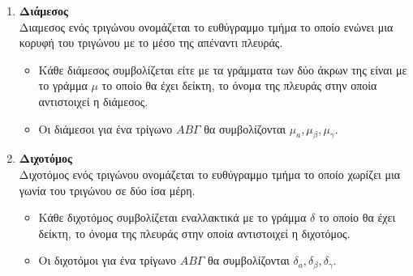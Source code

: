 \documentclass[twoside,10pt]{book}
\begin{document}
\begin{enumerate}[label=\bf\arabic*.]
\item \textbf{Διάμεσος}\\
Διαμεσος ενός τριγώνου ονομάζεται το ευθύγραμμο τμήμα το οποίο ενώνει μια κορυφή του τριγώνου με το μέσο της απέναντι πλευράς. \begin{itemize}
\item Κάθε διάμεσος συμβολίζεται είτε με τα γράμματα των δύο άκρων της είναι με το γράμμα $ \mu $ το οποίο θα έχει δείκτη, το όνομα της πλευράς στην οποία αντιστοιχεί η διάμεσος. 
\item Οι διάμεσοι για ένα τρίγωνο $ AB\varGamma $ θα συμβολίζονται $ \mu_a,\mu_\beta,\mu_\gamma $.
\end{itemize}
\item \textbf{Διχοτόμος}\\
Διχοτόμος ενός τριγώνου ονομάζεται το ευθύγραμμο τμήμα το οποίο χωρίζει μια γωνία του τριγώνου σε δύο ίσα μέρη.
\begin{itemize}
\item Κάθε διχοτόμος συμβολίζεται εναλλακτικά με το γράμμα $ \delta $ το οποίο θα έχει δείκτη, το όνομα της πλευράς στην οποία αντιστοιχεί η διχοτόμος. 
\item Οι διχοτόμοι για ένα τρίγωνο $ AB\varGamma $ θα συμβολίζονται $ \delta_a,\delta_\beta,\delta_\gamma $.
\end{itemize}
\end{enumerate}
\end{document}
